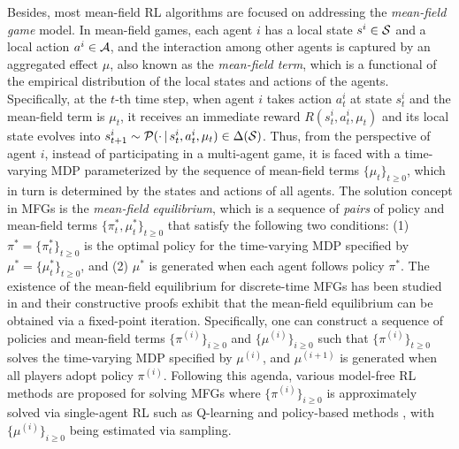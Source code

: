  
Besides, most mean-field RL algorithms are focused on addressing the   \textit{mean-field game} model.  
In mean-field games, each agent $i$ has a local state $s^i \in {\mathcal{S}} $ and a local action $a^i \in \mathcal{A}$, 
and  the interaction among other agents is  captured  by an aggregated effect $\mu$, also known as the \emph{mean-field term}, which is a functional of the empirical distribution of the local states and actions of the agents.  
Specifically, at the $t$-th time step, when  agent $i$ takes action $a_t^i$ at state $s_t^i$ and the mean-field term is $\mu_t$, it receives an immediate reward $R(s_t^i, a_t^i, \mu_t)$ and its local state evolves into $  s_{t+1}^i \sim \mathcal{P}(\cdot {\,|\,} s_t^i, a_t^i, \mu_t) \in \Delta({\mathcal{S}})$. Thus, from the perspective of agent $i$,  instead of participating in a multi-agent game, it is faced with a time-varying MDP parameterized by the sequence of mean-field terms $\{ \mu_t \}_{t\geq 0}$, which in turn is determined by the states and actions of all agents. 
The solution concept in MFGs is the   \emph{mean-field equilibrium}, which is a sequence of \emph{pairs} of policy and mean-field terms
$\{\pi^*_t, \mu^*_t \}_{t\geq 0}$ that satisfy the following two conditions: (1) $\pi^* = \{\pi^*_{t} \}_{t\geq 0}$ is the optimal policy for the time-varying MDP specified by $\mu^* = \{\mu^*_t \}_{t\geq 0}$, and (2)  $\mu^*$ is generated when each agent follows policy $\pi^*$.  The existence of the mean-field equilibrium for discrete-time MFGs has been  studied in  
\cite{saldi2018markov, saldi2019approximate,saldi2019discrete,saldi2018discrete}
and their constructive  proofs exhibit that the mean-field equilibrium can be obtained via a fixed-point iteration. Specifically, one can construct a sequence of policies and mean-field terms $\{\pi^{(i)} \}_{i\geq 0}$ and $\{ \mu^{(i)}\} _{i\geq 0}$ such that $\{ \pi^{(i)}\}_{t\geq 0}$ solves the time-varying MDP specified by $\mu^{(i)}
$, and $\mu^{(i+1)}$ is generated when all players adopt policy $\pi^{(i)}$. 
Following this agenda, various model-free RL methods are proposed for solving MFGs where $\{\pi^{(i)} \}_{i\geq 0}$ is approximately solved via single-agent RL such as Q-learning \cite{guo2019learning} and policy-based methods 
\cite{subramanian2019reinforcement, fu2019actor}, with  $\{ \mu^{(i)}\} _{i\geq 0}$ being  estimated via sampling.  
